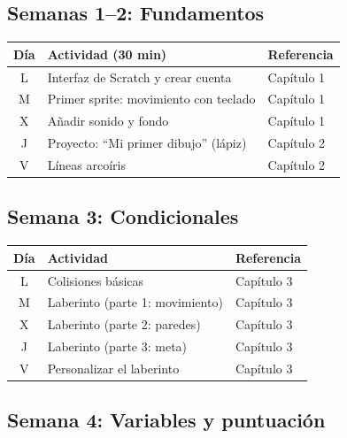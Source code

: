 \documentclass[11pt,a4paper]{article}
\begin{document}
\subsection{Semanas 1--2: Fundamentos}

\begin{center}
\renewcommand{\arraystretch}{1.3}
\begin{tabularx}{\linewidth}{c l X}
\toprule
\textbf{Día} & \textbf{Actividad (30 min)} & \textbf{Referencia} \\
\midrule
L & Interfaz de Scratch y crear cuenta        & Capítulo 1 \\
M & Primer sprite: movimiento con teclado     & Capítulo 1 \\
X & Añadir sonido y fondo                     & Capítulo 1 \\
J & Proyecto: ``Mi primer dibujo'' (lápiz)    & Capítulo 2 \\
V & Líneas arcoíris                           & Capítulo 2 \\
\bottomrule
\end{tabularx}
\end{center}

\subsection{Semana 3: Condicionales}

\begin{center}
\renewcommand{\arraystretch}{1.3}
\begin{tabularx}{\linewidth}{c l X}
\toprule
\textbf{Día} & \textbf{Actividad} & \textbf{Referencia} \\
\midrule
L & Colisiones básicas              & Capítulo 3 \\
M & Laberinto (parte 1: movimiento) & Capítulo 3 \\
X & Laberinto (parte 2: paredes)    & Capítulo 3 \\
J & Laberinto (parte 3: meta)       & Capítulo 3 \\
V & Personalizar el laberinto       & Capítulo 3 \\
\bottomrule
\end{tabularx}
\end{center}

\subsection{Semana 4: Variables y puntuación}
\end{document}
